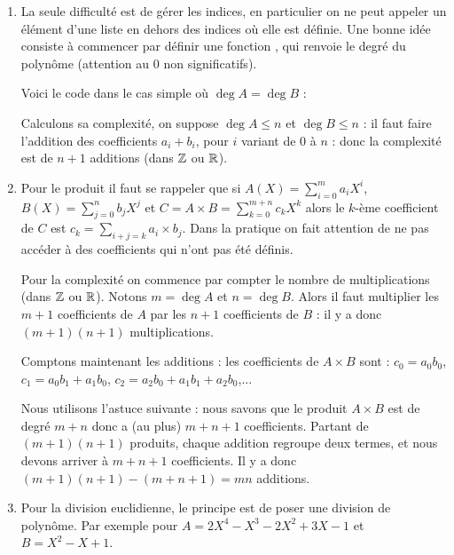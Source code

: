 \documentclass[class=report,crop=false]{standalone}
\begin{document}
\begin{enumerate}
  \item La seule difficulté est de gérer les indices, en particulier on ne peut
  appeler un élément d'une liste en dehors des indices où elle est définie.
  Une bonne idée consiste à commencer par définir une fonction ,
  qui renvoie le degré du polynôme (attention au $0$ non significatifs).

  Voici le code dans le cas simple où $\deg A = \deg B$ :


  Calculons sa complexité, on suppose $\deg A \le n$ et $\deg B \le n$ :
  il faut faire l'addition des coefficients $a_i+b_i$, pour $i$ variant de $0$ à
  $n$ : donc la complexité est de $n+1$ additions (dans $\mathbb{Z}$ ou $\mathbb{R}$).

  \item Pour le produit il faut se rappeler que si $A(X) = \sum_{i=0}^m a_i X^i$,
  $B(X) = \sum_{j=0}^n b_j X^j$ et $C = A \times B = \sum_{k=0}^{m+n} c_k X^k$ alors
  le $k$-ème coefficient de $C$ est $c_k = \sum_{i+j=k} a_i \times b_j$.
  Dans la pratique on fait attention de ne pas accéder à des coefficients qui n'ont pas été définis.


  Pour la complexité on commence par compter le nombre de multiplications (dans $\mathbb{Z}$ ou $\mathbb{R}$).
  Notons $m = \deg A$ et $n = \deg B$. Alors il faut multiplier les $m+1$ coefficients de $A$ par les $n+1$ coefficients de $B$ :
  il y a donc $(m+1)(n+1)$ multiplications.

  Comptons maintenant les additions : les coefficients de $A\times B$ sont :
  $c_0 = a_0 b_0$, $c_1 = a_0b_1+a_1b_0$, $c_2=a_2b_0+a_1b_1+a_2b_0$,...

  Nous utilisons l'astuce suivante : nous savons que le produit $A\times B$ est de degré $m+n$
  donc a (au plus) $m+n+1$ coefficients. Partant de $(m+1)(n+1)$ produits,
  chaque addition regroupe deux termes, et nous devons arriver à $m+n+1$ coefficients.
  Il y a donc $(m+1)(n+1)-(m+n+1) = mn$ additions.

  \item Pour la division euclidienne, le principe est de poser une division de polynôme.
  Par exemple pour $A = 2X^4-X^3-2X^2+3X-1$ et $B=X^2-X+1$.



\end{enumerate}
\end{document}
